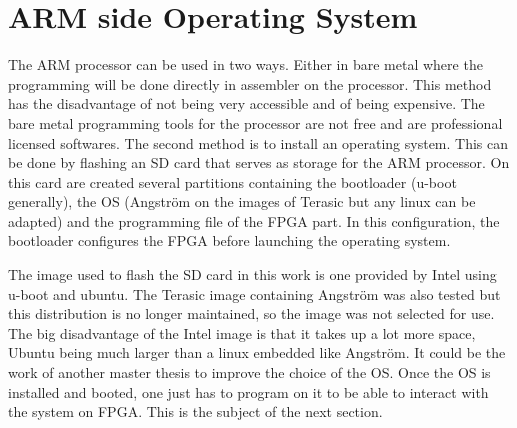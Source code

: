 \section{ARM side Operating System}

The ARM processor can be used in two ways. Either in bare metal where the programming will be done 
directly in assembler on the processor. This method has the disadvantage of not being very 
accessible and of being expensive. The bare metal programming tools for the processor are not 
free and are professional licensed softwares. The second method is to install an operating system. 
This can be done by flashing an SD card that serves as storage for the ARM processor. On this card 
are created several partitions containing the bootloader (u-boot generally), the OS (Angström on 
the images of Terasic but any linux can be adapted) and the programming file of the FPGA part. In 
this configuration, the bootloader configures the FPGA before launching the operating system. 

The image used to flash the SD card in this work is one provided by Intel using u-boot and ubuntu. The 
Terasic image containing Angström was also tested but this distribution is no longer maintained, so 
the image was not selected for use. The big disadvantage of the Intel image is that it takes up a 
lot more space, Ubuntu being much larger than a linux embedded like Angström. It could be the work of 
another master thesis to improve the choice of the OS. Once the OS is installed and booted, one just 
has to program on it to be able to interact with the system on FPGA. This is the subject of the next 
section.